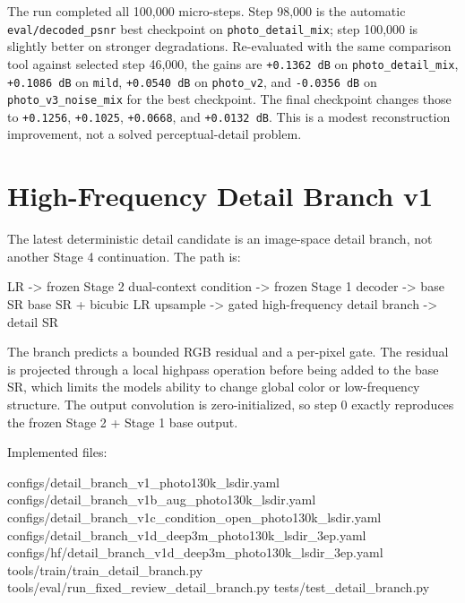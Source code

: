 \documentclass[
  10pt,
]{article}
\newenvironment{Shaded}{}{}
\newcommand{\NormalTok}[1]{#1}
\begin{document}
The run completed all 100,000 micro-steps. Step 98,000 is the automatic
\texttt{eval/decoded\_psnr} best checkpoint on
\texttt{photo\_detail\_mix}; step 100,000 is slightly better on stronger
degradations. Re-evaluated with the same comparison tool against
selected step 46,000, the gains are \texttt{+0.1362\ dB} on
\texttt{photo\_detail\_mix}, \texttt{+0.1086\ dB} on \texttt{mild},
\texttt{+0.0540\ dB} on \texttt{photo\_v2}, and \texttt{-0.0356\ dB} on
\texttt{photo\_v3\_noise\_mix} for the best checkpoint. The final
checkpoint changes those to \texttt{+0.1256}, \texttt{+0.1025},
\texttt{+0.0668}, and \texttt{+0.0132\ dB}. This is a modest
reconstruction improvement, not a solved perceptual-detail problem.

\hypertarget{high-frequency-detail-branch-v1}{%
\section{High-Frequency Detail Branch
v1}\label{high-frequency-detail-branch-v1}}

The latest deterministic detail candidate is an image-space detail
branch, not another Stage 4 continuation. The path is:

\begin{Shaded}
\begin{Highlighting}[]
\NormalTok{LR {-}\textgreater{} frozen Stage 2 dual{-}context condition {-}\textgreater{} frozen Stage 1 decoder {-}\textgreater{} base SR}
\NormalTok{base SR + bicubic LR upsample {-}\textgreater{} gated high{-}frequency detail branch {-}\textgreater{} detail SR}
\end{Highlighting}
\end{Shaded}

The branch predicts a bounded RGB residual and a per-pixel gate. The
residual is projected through a local highpass operation before being
added to the base SR, which limits the model\textquotesingle s ability
to change global color or low-frequency structure. The output
convolution is zero-initialized, so step 0 exactly reproduces the frozen
Stage 2 + Stage 1 base output.

Implemented files:

\begin{Shaded}
\begin{Highlighting}[]
\NormalTok{configs/detail\_branch\_v1\_photo130k\_lsdir.yaml}
\NormalTok{configs/detail\_branch\_v1b\_aug\_photo130k\_lsdir.yaml}
\NormalTok{configs/detail\_branch\_v1c\_condition\_open\_photo130k\_lsdir.yaml}
\NormalTok{configs/detail\_branch\_v1d\_deep3m\_photo130k\_lsdir\_3ep.yaml}
\NormalTok{configs/hf/detail\_branch\_v1d\_deep3m\_photo130k\_lsdir\_3ep.yaml}
\NormalTok{tools/train/train\_detail\_branch.py}
\NormalTok{tools/eval/run\_fixed\_review\_detail\_branch.py}
\NormalTok{tests/test\_detail\_branch.py}
\end{Highlighting}
\end{Shaded}
\end{document}
